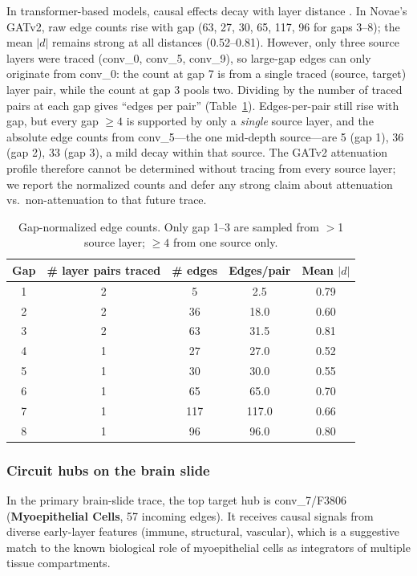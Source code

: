 \documentclass[11pt]{article}
\begin{document}
In transformer-based models, causal effects decay with layer distance
\citep{sae_atlas}. In Novae's GATv2, raw edge counts rise with gap
(63, 27, 30, 65, 117, 96 for gaps 3--8); the mean $|d|$ remains strong
at all distances (0.52--0.81). However, only three source layers were
traced (conv\_0, conv\_5, conv\_9), so large-gap edges can only
originate from conv\_0: the count at gap 7 is from a single traced
(source, target) layer pair, while the count at gap 3 pools two.
Dividing by the number of traced pairs at each gap gives ``edges per
pair'' (Table~\ref{tab:gap_normalized}). Edges-per-pair still rise
with gap, but every gap $\geq 4$ is supported by only a \emph{single}
source layer, and the absolute edge counts from conv\_5---the one
mid-depth source---are 5 (gap 1), 36 (gap 2), 33 (gap 3), a mild
decay within that source. The GATv2 attenuation profile therefore
cannot be determined without tracing from every source layer; we
report the normalized counts and defer any strong claim about
attenuation vs.\ non-attenuation to that future trace.

\begin{table}[ht]
\centering
\caption{Gap-normalized edge counts. Only gap 1--3 are sampled
from $>$1 source layer; $\geq 4$ from one source only.}
\label{tab:gap_normalized}
\small
\begin{tabular}{ccccc}
\toprule
Gap & \# layer pairs traced & \# edges & Edges/pair & Mean $|d|$ \\
\midrule
1 & 2 & 5   & 2.5   & 0.79 \\
2 & 2 & 36  & 18.0  & 0.60 \\
3 & 2 & 63  & 31.5  & 0.81 \\
4 & 1 & 27  & 27.0  & 0.52 \\
5 & 1 & 30  & 30.0  & 0.55 \\
6 & 1 & 65  & 65.0  & 0.70 \\
7 & 1 & 117 & 117.0 & 0.66 \\
8 & 1 & 96  & 96.0  & 0.80 \\
\bottomrule
\end{tabular}
\end{table}

\subsubsection{Circuit hubs on the brain slide}

In the primary brain-slide trace, the top target hub is conv\_7/F3806
(\textbf{Myoepithelial Cells}, 57 incoming edges). It receives
causal signals from diverse early-layer features (immune, structural,
vascular), which is a suggestive match to the known biological role
of myoepithelial cells as integrators of multiple tissue
compartments.
\end{document}
